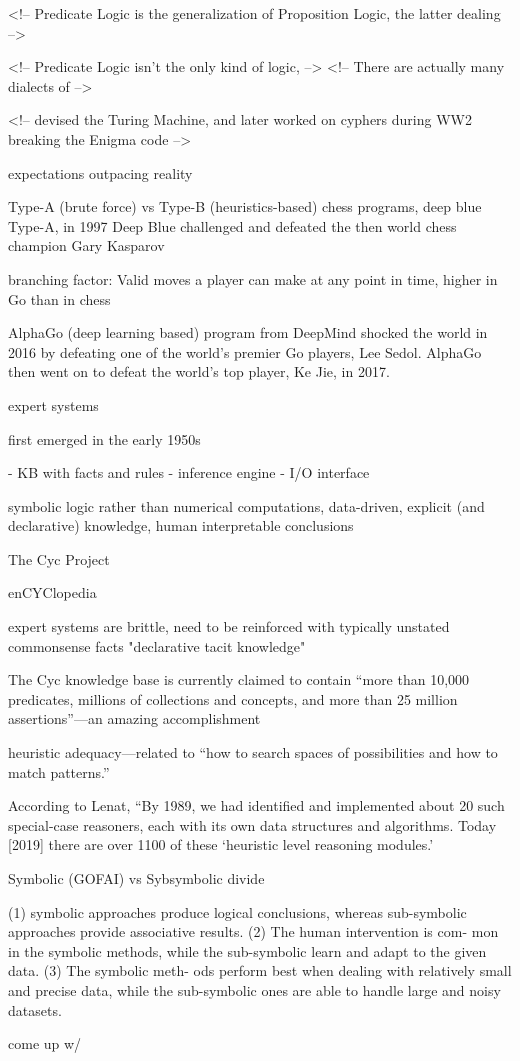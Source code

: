 <!-- Predicate Logic is the generalization of Proposition Logic, the latter dealing -->




<!-- Predicate Logic isn't the only kind of logic,  -->
<!-- There are actually many dialects of  -->




<!-- devised the Turing Machine, and later worked on cyphers during WW2 breaking the Enigma code -->

expectations outpacing reality

Type-A (brute force) vs Type-B (heuristics-based) chess programs, deep blue Type-A, in 1997 Deep Blue challenged and defeated the then world chess champion Gary Kasparov

branching factor: Valid moves a player can make at any point in time, higher in Go than in chess

AlphaGo (deep learning based) program from DeepMind shocked the world in 2016 by defeating one of the world’s premier Go players, Lee Sedol. AlphaGo then went on to defeat the world’s top player, Ke Jie, in 2017.  \cite{brachman2022machines}

expert systems

first emerged in the early 1950s 

- KB with facts and rules
- inference engine 
- I/O interface

symbolic logic rather than numerical computations, data-driven, explicit (and declarative) knowledge, human interpretable conclusions


\cite{brachman2022machines}


The Cyc Project

\cite{brachman2022machines}

enCYClopedia

expert systems are brittle, need to be reinforced with typically unstated commonsense facts "declarative tacit knowledge"  

The Cyc knowledge base is currently claimed to contain “more than 10,000 predicates, millions of collections and concepts, and more than 25 million assertions”—an amazing accomplishment \cite{brachman2022machines}

heuristic adequacy—related to “how to search spaces of possibilities and
how to match patterns.”

 According to Lenat,
“By 1989, we had identified and implemented about 20 such special-case
reasoners, each with its own data structures and algorithms. Today [2019]
there are over 1100 of these ‘heuristic level reasoning modules.’


Symbolic (GOFAI) vs Sybsymbolic divide

(1) symbolic approaches produce logical
conclusions, whereas sub-symbolic approaches provide
associative results. (2) The human intervention is com-
mon in the symbolic methods, while the sub-symbolic
learn and adapt to the given data. (3) The symbolic meth-
ods perform best when dealing with relatively small and
precise data, while the sub-symbolic ones are able to
handle large and noisy datasets.


come up w/